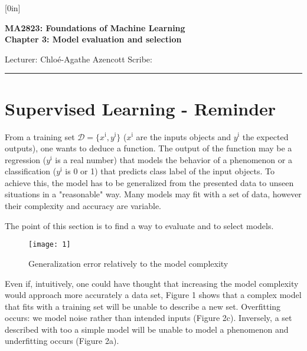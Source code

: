\documentclass[a4paper,12pt]{article}
\begin{document}
\raisebox{0.6in}[0in]{}
\vspace{-0.7in}

\begin{center}
\bf\large MA2823: Foundations of Machine Learning \\
Chapter 3: Model evaluation and selection
\end{center}

\noindent
Lecturer: Chlo\'e-Agathe Azencott   
\hfill
Scribe: 

\noindent
\rule{\textwidth}{1pt}

\medskip

\section{Supervised Learning - Reminder}

From a training set $\mathcal{D}=\{x^{\text{i}},y^{\text{i}} \}$ ($x^{\text{i}}$ are the inputs objects and $y^{\text{i}}$ the expected outputs), one wants to deduce a function. The output of the function may be a regression ($y^{\text{i}}$ is a real number)  that models the behavior of a phenomenon or a classification ($y^{\text{i}}$ is 0 or 1) that predicts class label of the input objects. To achieve this, the model has to be generalized from the presented data to unseen situations in a "reasonable" way. Many models may fit with a set of data, however their complexity and accuracy are variable. 

The point of this section is to find a way to evaluate and to select models. 
\begin{figure}[!h]
\centering
\texttt{[image: 1]}
\caption{\label{fig:1}Generalization error relatively to the model complexity}
\end{figure}


Even if, intuitively, one could have thought that increasing the model complexity would approach more accurately a data set, Figure 1 shows that a complex model that fits with a training set  will be unable to describe a new  set. Overfitting occurs: we model noise rather than intended inputs (Figure 2c). Inversely, a set described with too a simple model will be unable to model a phenomenon and underfitting occurs (Figure 2a).
\end{document}
